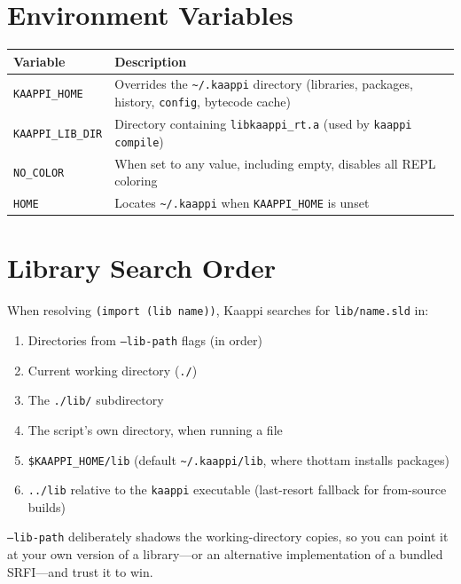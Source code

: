 \section{Environment Variables}

\begin{center}
\small
\begin{tabularx}{\textwidth}{@{}lY@{}}
\textbf{Variable} & \textbf{Description} \\
\hline
\texttt{KAAPPI\_HOME} & Overrides the \texttt{\textasciitilde/.kaappi} directory (libraries, packages, history, \texttt{config}, bytecode cache) \\
\texttt{KAAPPI\_LIB\_DIR} & Directory containing \texttt{libkaappi\_rt.a} (used by \texttt{kaappi compile}) \\
\texttt{NO\_COLOR} & When set to any value, including empty, disables all REPL coloring \\
\texttt{HOME} & Locates \texttt{\textasciitilde/.kaappi} when \texttt{KAAPPI\_HOME} is unset \\
\end{tabularx}
\end{center}

\section{Library Search Order}

When resolving \texttt{(import (lib name))}, Kaappi searches for \texttt{lib/name.sld} in:

\begin{enumerate}
    \item Directories from \texttt{--lib-path} flags (in order)
    \item Current working directory (\texttt{./})
    \item The \texttt{./lib/} subdirectory
    \item The script's own directory, when running a file
    \item \texttt{\$KAAPPI\_HOME/lib} (default \texttt{\textasciitilde/.kaappi/lib}, where thottam installs packages)
    \item \texttt{../lib} relative to the \texttt{kaappi} executable (last-resort fallback for from-source builds)
\end{enumerate}

\texttt{--lib-path} deliberately shadows the working-directory copies, so you can point it at your own version of a library---or an alternative implementation of a bundled SRFI---and trust it to win.

